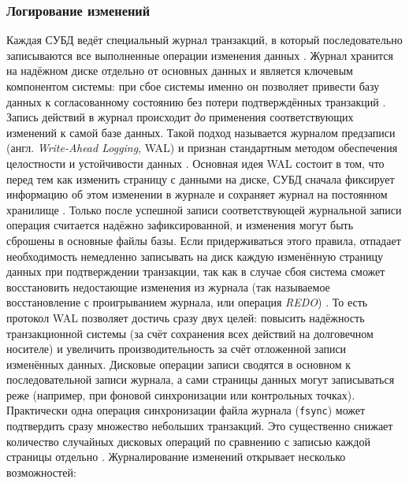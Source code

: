 \subsubsection{Логирование изменений} 

 Каждая СУБД ведёт специальный журнал транзакций, в который последовательно записываются все выполненные операции изменения данных \autocite{MicrosoftLearnSQLserverTransLog}. Журнал хранится на надёжном диске отдельно от основных данных и является ключевым компонентом системы: при сбое системы именно он позволяет привести базу данных к согласованному состоянию без потери подтверждённых транзакций \autocite{MicrosoftLearnSQLserverTransLog}. Запись действий в журнал происходит \textit{до} применения соответствующих изменений к самой базе данных. Такой подход называется журналом предзаписи (англ. \textit{Write-Ahead Logging}, WAL) и признан стандартным методом обеспечения целостности и устойчивости данных \autocite{PostgreSQLdocc28}. Основная идея WAL состоит в том, что перед тем как изменить страницу с данными на диске, СУБД сначала фиксирует информацию об этом изменении в журнале и сохраняет журнал на постоянном хранилище \autocite{PostgreSQLdocc28}. Только после успешной записи соответствующей журнальной записи операция считается надёжно зафиксированной, и изменения могут быть сброшены в основные файлы базы. Если придерживаться этого правила, отпадает необходимость немедленно записывать на диск каждую изменённую страницу данных при подтверждении транзакции, так как в случае сбоя система сможет восстановить недостающие изменения из журнала (так называемое восстановление с проигрыванием журнала, или операция \textit{REDO}) \autocite{PostgreSQLdocc28}. То есть протокол WAL позволяет достичь сразу двух целей: повысить надёжность транзакционной системы (за счёт сохранения всех действий на долговечном носителе) и увеличить производительность за счёт отложенной записи изменённых данных. Дисковые операции записи сводятся в основном к последовательной записи журнала, а сами страницы данных могут записываться реже (например, при фоновой синхронизации или контрольных точках). Практически одна операция синхронизации файла журнала (\texttt{fsync}) может подтвердить сразу множество небольших транзакций. Это существенно снижает количество случайных дисковых операций по сравнению с записью каждой страницы отдельно \autocite{PostgreSQLdocc28}. 
 Журналирование изменений открывает несколько возможностей:
